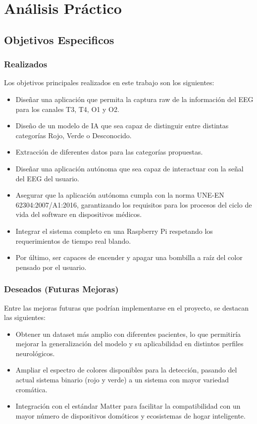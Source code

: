 \chapter{Análisis Práctico}\label{ch:practical_analytics}

\section{Objetivos Especificos}
\subsection{Realizados}

Los objetivos principales realizados en este trabajo son los siguientes:

\begin{itemize}
    \item Diseñar una aplicación que permita la captura raw de la información del EEG para los canales T3, T4, O1 y O2.
    \item Diseño de un modelo de IA que sea capaz de distinguir entre distintas categorías Rojo, Verde o Desconocido.
    \item Extracción de diferentes datos para las categorías propuestas.
    \item Diseñar una aplicación autónoma que sea capaz de interactuar con la señal del EEG del usuario.
    \item Asegurar que la aplicación autónoma cumpla con la norma UNE-EN 62304:2007/A1:2016, garantizando los requisitos para los procesos del ciclo de vida del software en dispositivos médicos.
    \item Integrar el sistema completo en una Raspberry Pi respetando los requerimientos de tiempo real blando.
    \item Por último, ser capaces de encender y apagar una bombilla a raíz del color pensado por el usuario.
\end{itemize}

\newpage

\subsection{Deseados (Futuras Mejoras)}

Entre las mejoras futuras que podrían implementarse en el proyecto, se destacan las siguientes:

\begin{itemize}
    \item Obtener un dataset más amplio con diferentes pacientes, lo que permitiría mejorar la generalización del modelo y su aplicabilidad en distintos perfiles neurológicos.
    \item Ampliar el espectro de colores disponibles para la detección, pasando del actual sistema binario (rojo y verde) a un sistema con mayor variedad cromática.
    \item Integración con el estándar Matter para facilitar la compatibilidad con un mayor número de dispositivos domóticos y ecosistemas de hogar inteligente.
\end{itemize}

